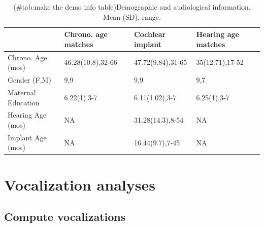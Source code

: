 \documentclass[
]{article}
\begin{document}
\begin{table}[!h]

\caption{(\#tab:make the demo info table)Demographic and audiological information. Mean (SD), range.}
\centering
\begin{tabular}[t]{llll}
\toprule
  & Chrono. age matches & Cochlear implant & Hearing age matches\\
\midrule
Chrono. Age (mos) & 46.28(10.8),32-66 & 47.72(9.84),31-65 & 35(12.71),17-52\\
Gender (F,M) & 9,9 & 9,9 & 9,7\\
Maternal Education & 6.22(1),3-7 & 6.11(1.02),3-7 & 6.25(1),3-7\\
Hearing Age (mos) & NA & 31.28(14.3),8-54 & NA\\
Implant Age (mos) & NA & 16.44(9.7),7-45 & NA\\
\bottomrule
\end{tabular}
\end{table}

\hypertarget{vocalization-analyses}{%
\section{Vocalization analyses}\label{vocalization-analyses}}

\hypertarget{compute-vocalizations}{%
\subsection{Compute vocalizations}\label{compute-vocalizations}}
\end{document}
